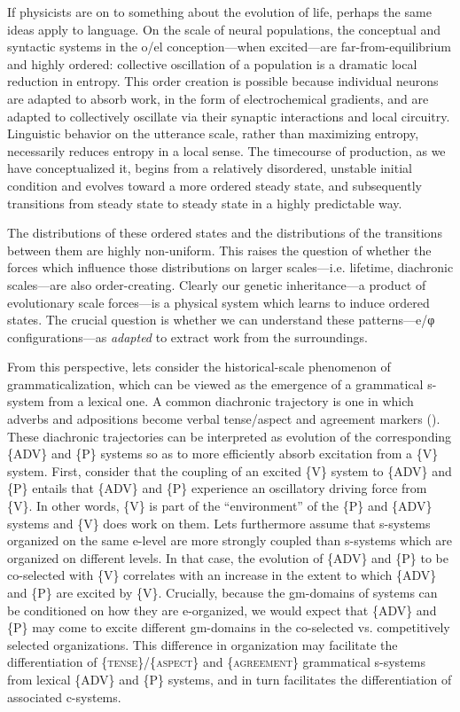   If physicists are on to something about the evolution of life, perhaps the same ideas apply to language. On the scale of neural populations, the conceptual and syntactic systems in the o/el conception—when excited—are far-from-equilibrium and highly ordered: collective oscillation of a population is a dramatic local reduction in entropy. This order creation is possible because individual neurons are adapted to absorb work, in the form of electrochemical gradients, and are adapted to collectively oscillate via their synaptic interactions and local circuitry. Linguistic behavior on the utterance scale, rather than maximizing entropy, necessarily reduces entropy in a local sense. The timecourse of production, as we have conceptualized it, begins from a relatively disordered, unstable initial condition and evolves toward a more ordered steady state, and subsequently transitions from steady state to steady state in a highly predictable way. 

  The distributions of these ordered states and the distributions of the transitions between them are highly non-uniform. This raises the question of whether the forces which influence those distributions on larger scales—i.e. lifetime, diachronic scales—are also order-creating. Clearly our genetic inheritance—a product of evolutionary scale forces—is a physical system which learns to induce ordered states. The crucial question is whether we can understand these patterns—e/φ configurations—as \textit{adapted} to extract work from the surroundings.

  From this perspective, lets consider the historical-scale phenomenon of grammaticalization, which can be viewed as the emergence of a grammatical s-system from a lexical one. A common diachronic trajectory is one in which adverbs and adpositions become verbal tense/aspect and agreement markers (\citealt{HeineKuteva2002,TraugottHeine1991}). These diachronic trajectories can be interpreted as evolution of the corresponding \{ADV\} and \{P\} systems so as to more efficiently absorb excitation from a \{V\} system. First, consider that the coupling of an excited \{V\} system to \{ADV\} and \{P\} entails that \{ADV\} and \{P\} experience an oscillatory driving force from \{V\}. In other words, \{V\} is part of the “environment” of the \{P\} and \{ADV\} systems and \{V\} does work on them. Lets furthermore assume that s-systems organized on the same e-level are more strongly coupled than s-systems which are organized on different levels. In that case, the evolution of \{ADV\} and \{P\} to be co-selected with \{V\} correlates with an increase in the extent to which \{ADV\} and \{P\} are excited by \{V\}. Crucially, because the gm-domains of systems can be conditioned on how they are e-organized, we would expect that \{ADV\} and \{P\} may come to excite different gm-domains in the co-selected vs. competitively selected organizations. This difference in organization may facilitate the differentiation of \{\textsc{tense}\}/\{\textsc{aspect}\} and \{\textsc{agreement}\} grammatical s-systems from lexical \{ADV\} and \{P\} systems, and in turn facilitates the differentiation of associated c-systems. 

